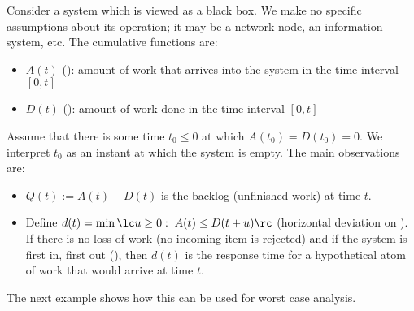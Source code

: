 Consider a system which is viewed as a black box.
We make no specific assumptions about its
operation; it may be a network node, an
information system, etc.  The cumulative
functions are:
\begin{itemize}
  \item $A(t)$ (): amount of work that arrives into the system in the time interval $[0,t]$
  \item $D(t)$ (): amount of work done in the time interval $[0,t]$
\end{itemize}

Assume that there is some time $t_0\leq 0$ at
which
    $A(t_0)=D(t_0)=0$.
    We interpret $t_0$ as an instant
  at which the system is empty. The main observations are:

\begin{sh}\begin{itemize}
  \item $Q(t):=A(t)-D(t)$ is the backlog (unfinished work) at time $t$.
  \item Define $d(t)=\min\lc u\geq 0: \; A(t)\leq
  D(t+u)\rc$ (horizontal deviation on
  ). If there is no loss of work (no incoming
  item is rejected) and if the system is first
  in, first out (), then $d(t)$ is the response time for a hypothetical atom of work that
would arrive at time $t$.
\end{itemize}\end{sh}
\begin{figure}[!htbp]
\end{figure}
The next example shows how this can be used for
worst case analysis.
